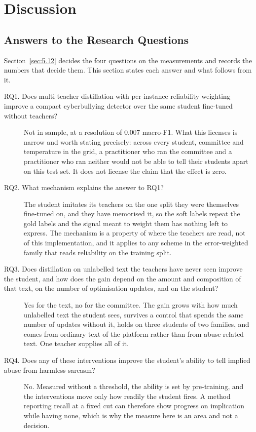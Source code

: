 \chapter{Discussion}
\label{ch:6}

\section{Answers to the Research Questions}
\label{sec:6.1}
Section~\ref{sec:5.12} decides the four questions on the measurements and records the numbers that
decide them. This section states each answer and what follows from it.
\begin{description}
  \item[RQ1. Does multi-teacher distillation with per-instance reliability weighting improve a compact
    cyberbullying detector over the same student fine-tuned without teachers?]
    Not in sample, at a resolution of 0.007 macro-F1. What this licenses is narrow and worth stating
    precisely: across every student, committee and temperature in the grid, a practitioner who ran the
    committee and a practitioner who ran neither would not be able to tell their students apart on this
    test set. It does not license the claim that the effect is zero.
  \item[RQ2. What mechanism explains the answer to RQ1?] The student imitates its teachers on the one
    split they were themselves fine-tuned on, and they have memorised it, so the soft labels repeat the
    gold labels and the signal meant to weight them has nothing left to express. The mechanism is a
    property of where the teachers are read, not of this implementation, and it applies to any scheme in
    the error-weighted family that reads reliability on the training split.
  \item[RQ3. Does distillation on unlabelled text the teachers have never seen improve the student, and
    how does the gain depend on the amount and composition of that text, on the number of optimisation
    updates, and on the student?] Yes for the text, no for the committee. The gain grows with how much
    unlabelled text the student sees, survives a control that spends the same number of updates without
    it, holds on three students of two families, and comes from ordinary text of the platform rather
    than from abuse-related text. One teacher supplies all of it.
  \item[RQ4. Does any of these interventions improve the student's ability to tell implied abuse from
    harmless sarcasm?] No. Measured without a threshold, the ability is set by pre-training, and the
    interventions move only how readily the student fires. A method reporting recall at a fixed cut can
    therefore show progress on implication while having none, which is why the measure here is an area
    and not a decision.
\end{description}

